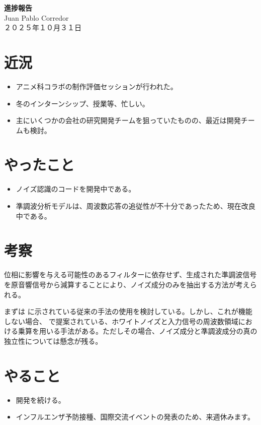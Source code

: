 \documentclass[a4paper, 11pt]{article}
\begin{document}
\begin{center}
    {\LARGE \bfseries 進捗報告} \\ %
    \vspace{0.3em} %
    Juan Pablo Corredor \\ %
    ２０２５年１０月３１日 %
\end{center}
\vspace{0.5em} %

\section*{近況}
\begin{itemize}
    \item アニメ科コラボの制作評価セッションが行われた。
    \item 冬のインターンシップ、授業等、忙しい。
    \item 主にいくつかの会社の研究開発チームを狙っていたものの、最近は開発チームも検討。
\end{itemize} 

\section*{やったこと}
\begin{itemize} 
    \item ノイズ認識のコードを開発中である。 
    \item 準調波分析モデルは、周波数応答の追従性が不十分であったため、現在改良中である。 
\end{itemize}

\section*{考察}

位相に影響を与える可能性のあるフィルターに依存せず、生成された準調波信号を原音響信号から減算することにより、ノイズ成分のみを抽出する方法が考えられる。

まずは \cite{serra1990spectral} に示されている従来の手法の使用を検討している。しかし、これが機能しない場合、\cite{sitranoPiano} で提案されている、ホワイトノイズと入力信号の周波数領域における乗算を用いる手法がある。ただしその場合、ノイズ成分と準調波成分の真の独立性については懸念が残る。


\section*{やること}
\begin{itemize}
    \item 開発を続ける。
    \item インフルエンザ予防接種、国際交流イベントの発表のため、来週休みます。
\end{itemize}



\end{document}

